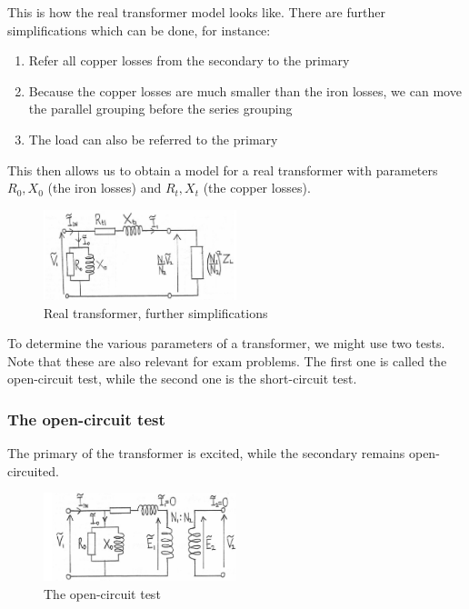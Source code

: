 \documentclass{article}
\begin{document}
This is how the real transformer model looks like. There are further simplifications which can be done, for instance:

\begin{enumerate}
    \item Refer all copper losses from the secondary to the primary
    \item Because the copper losses are much smaller than the iron losses, we can move the parallel grouping before the series grouping
    \item The load can also be referred to the primary
\end{enumerate}

This then allows us to obtain a model for a real transformer with parameters $R_0, X_0$ (the iron losses) and $R_t, X_t$ (the copper losses).

\begin{figure}[h]
    \centering
    \includegraphics[width = 0.5\textwidth]{images/transf2.png}
    \caption{Real transformer, further simplifications}
    \label{fig:enter-label}
\end{figure}

To determine the various parameters of a transformer, we might use two tests. Note that these are also relevant for exam problems. The first one is called the open-circuit test, while the second one is the short-circuit test.

\subsubsection{The open-circuit test}

The primary of the transformer is excited, while the secondary remains open-circuited.

\begin{figure}[h]
    \centering
    \includegraphics[width = 0.5\textwidth]{images/opencircuit.png}
    \caption{The open-circuit test}
    \label{fig:enter-label}
\end{figure}
\end{document}

